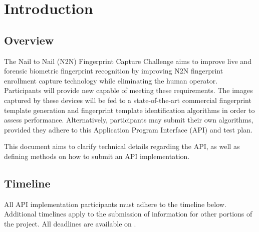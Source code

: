\section{Introduction}

\subsection{Overview}
The Nail to Nail (N2N) Fingerprint Capture Challenge aims to improve live
and forensic biometric fingerprint recognition by improving N2N fingerprint
enrollment capture technology while eliminating the human operator.
Participants will provide new \scanners capable of meeting these requirements.
The images captured by these devices will be fed to a state-of-the-art
commercial fingerprint template generation and fingerprint template
identification algorithms in order to assess performance. Alternatively,
participants may submit their own algorithms, provided they adhere to this
Application Program Interface (API) and test plan.

This document aims to clarify technical details regarding the API, as well as
defining methods on how to submit an API implementation.

\subsection{Timeline}
\label{subsec:intro-timeline}
All API implementation participants must adhere to the timeline below.
Additional timelines apply to the submission of information for other portions
of the project. All deadlines are available on \theprojectwebsite.

